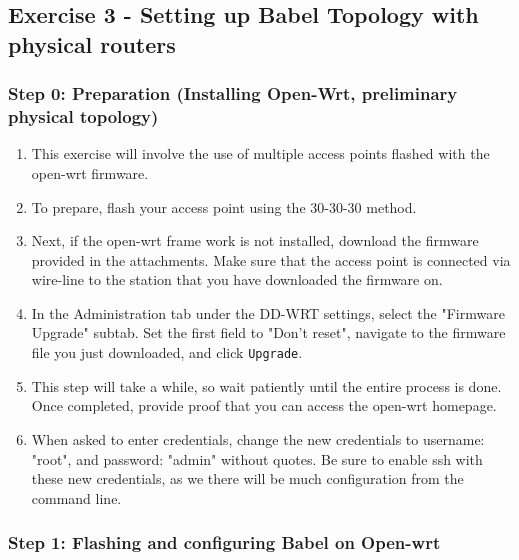 \documentclass[main.tex]{subfiles}
\begin{document}
\subsection{Exercise 3 - Setting up Babel Topology with physical routers}
\begin{itemize}


\subsubsection{Step 0: Preparation (Installing Open-Wrt, preliminary physical topology)} 
\begin{enumerate}[noitemsep,label=$\bullet$,leftmargin=20mm,labelsep=0.5cm]

\item This exercise will involve the use of multiple access points flashed with the open-wrt firmware.


\item To prepare, flash your access point using the 30-30-30 method. 

\item Next, if the open-wrt frame work is not installed, download the firmware provided in the attachments. Make sure that the access point is connected via wire-line to the station that you have downloaded the firmware on.

\item In the Administration tab under the DD-WRT settings, select the "Firmware Upgrade" subtab. Set the first field to "Don't reset", navigate to the firmware file you just downloaded, and click \texttt{Upgrade}. 

\item This step will take a while, so wait patiently until the entire process is done. Once completed, provide proof that you can access the open-wrt homepage.

\item When asked to enter credentials, change the new credentials to username: "root", and password: "admin" without quotes. Be sure to enable ssh with these new credentials, as we there will be much configuration from the command line.

\end{enumerate}


\subsubsection{Step 1: Flashing and configuring  Babel on Open-wrt} 
\begin{enumerate}[noitemsep,label=$\bullet$,leftmargin=20mm,labelsep=0.5cm]


\end{enumerate}
\end{itemize}
\end{document}
